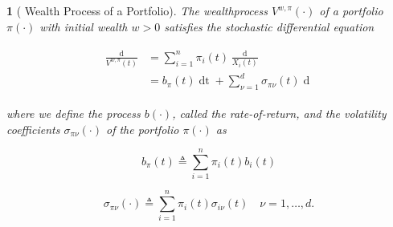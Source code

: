 \documentclass[british]{amsart} \usepackage{lmodern}
\numberwithin{equation}{section} \numberwithin{figure}{section}
\theoremstyle{plain} \newtheorem{thm}{\protect\theoremname}[section]
\theoremstyle{definition} \newtheorem{defn}[thm]{\protect\definitionname}
\theoremstyle{plain} \newtheorem{assumption}[thm]{\protect\assumptionname}
\theoremstyle{plain} \newtheorem{lem}[thm]{\protect\lemmaname}
\theoremstyle{plain} \newtheorem{prop}[thm]{\protect\propositionname}
\theoremstyle{remark} \newtheorem{rem}[thm]{\protect\remarkname}
\theoremstyle{plain} \newtheorem{cor}[thm]{\protect\corollaryname}
\renewcommand{\d}[1]{\mathop{\mathrm{d}{#1}}}
\newcommand{\defeq}{\mathop{\triangleq}} \newcommand{\almostsurely}{\text{a.s.}}
\begin{document}
\begin{prop} [{\cite[Equation 2.2]{fernholz2009}} Wealth Process of a Portfolio]

  The wealthprocess $V^{w,\pi}(\cdot)$ of a portfolio $\pi(\cdot)$
  with initial wealth $w > 0$ satisfies the stochastic differential equation

  \begin{gather}
    \label{eq:arithmeticreturnofportfolio}
    \begin{split}
      \frac{\d{V^{w,\pi}(t)}}{V^{w,\pi}(t)} 
        &= \sum_{i=1}^{n} \pi_{i}(t) \frac{\d{X_{i}(t)}}{X_{i}(t)} \\
        &= b_{\pi}(t)\d{t} + \sum_{\nu=1}^{d} \sigma_{\pi\nu}(t) \d{W_{\nu}(t)}
    \end{split}
  \end{gather}

  where we define the process $b(\cdot)$, called the \textit{rate-of-return}, and the
  volatility coefficients $\sigma_{\pi\nu}(\cdot)$ of the portfolio $\pi(\cdot)$ 
  as

  \begin{equation}
    \label{eq:wealthprocessrateofreturn}
    b_{\pi}(t) \defeq \sum_{i=1}^{n} \pi_{i}(t) b_{i}(t)
  \end{equation}

  \begin{equation}
    \label{eq:wealthprocessvolatility}
    \sigma_{\pi\nu}(\cdot) \defeq \sum_{i=1}^{n} \pi_{i}(t) \sigma_{i\nu}(t)
    \quad \nu=1,\dots,d.
  \end{equation}

\end{prop}
\end{document}
